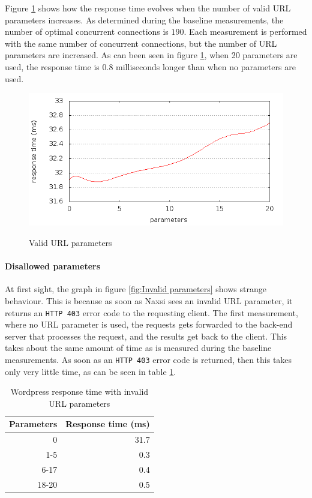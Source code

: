 \documentclass[Experiments]{subfiles}
\begin{document}
Figure \ref{fig:wordpress_with_naxsi_valid_parameters} shows how the response time evolves when the number of valid \ac{URL} parameters increases. As determined during the baseline measurements, the number of optimal concurrent connections is $190$. Each measurement is performed with the same number of concurrent connections, but the number of \ac{URL} parameters are increased. As can been seen in figure \ref{fig:wordpress_with_naxsi_valid_parameters}, when 20 parameters are used, the response time is $0.8$ milliseconds longer than when no parameters are used.

\begin{figure}[H]
\caption{Valid URL parameters}
\centering
\includegraphics[scale=0.55] {images/results/wp_with_naxsi_incremented_allowed_parameters/output.png}
\label{fig:wordpress_with_naxsi_valid_parameters}
\end{figure}

\paragraph{Disallowed parameters}

At first sight, the graph in figure \ref{fig:Invalid parameters} shows strange behaviour. This is because as soon as Naxsi sees an invalid \ac{URL} parameter, it returns an \verb+HTTP 403+ error code to the requesting client. The first measurement, where no \ac{URL} parameter is used, the requests gets forwarded to the back-end server that processes the request, and the results get back to the client. This takes about the same amount of time as is measured during the baseline measurements. As soon as an \verb+HTTP 403+ error code is returned, then this takes only very little time, as can be seen in table \ref{tab:Wordpress response time with invalid URL parameters}.

\begin{table}[H]
\caption{Wordpress response time with invalid URL parameters}
\center
\begin{tabular}{|r|r|}
\hline
\textbf{Parameters} & \textbf{Response time (ms)}\\ \hline
0 & 31.7 \\ \hline
1-5 & 0.3 \\ \hline
6-17 & 0.4 \\ \hline
18-20 & 0.5 \\ \hline
\end{tabular}
\label{tab:Wordpress response time with invalid URL parameters}
\end{table}
\end{document}
